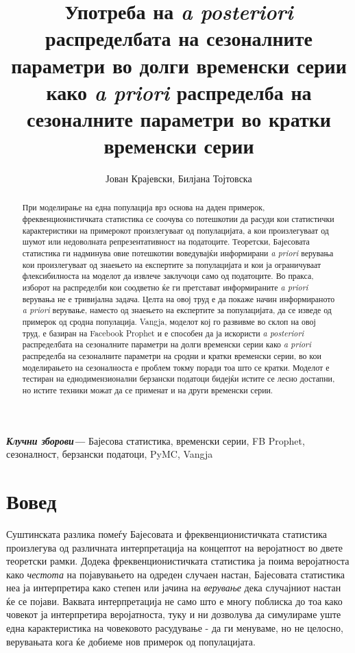 \documentclass[12pt]{article}
\title{Употреба на \textit{a posteriori} распределбата на сезоналните параметри во долги временски серии како \textit{a priori} распределба на сезоналните параметри во кратки временски серии}
\author{Јован Крајевски, Билјана Тојтовска}
\numberwithin{equation}{section}
\providecommand{\keywords}[1]
{
  \small
  \textbf{\textit{Клучни зборови---}} #1
}
\begin{document}
\maketitle

\newpage

\begin{abstract}
При моделирање на една популација врз основа на даден примерок, фреквенционистичката статистика се соочува со потешкотии да расуди кои статистички карактеристики на примерокот произлегуваат од популацијата, а кои произлегуваат од шумот или недоволната репрезентативност на податоците. Теоретски, Бајесовата статистика ги надминува овие потешкотии воведувајќи информирани \textit{a priori} верувања кои произлегуваат од знаењето на експертите за популацијата и кои ја ограничуваат флексибилноста на моделот да извлече заклучоци само од податоците. Во пракса, изборот на распределби кои соодветно ќе ги претстават информираните \textit{a priori} верувања не е тривијална задача. Целта на овој труд е да покаже начин информираното \textit{a priori} верување, наместо од знаењето на експертите за популацијата, да се изведе од примерок од сродна популација. Vangja, моделот кој го развивме во склоп на овој труд, е базиран на Facebook Prophet и е способен да ја искористи \textit{a posteriori} распределбата на сезоналните параметри на долги временски серии како \textit{a priori} распределба на сезоналните параметри на сродни и кратки временски серии, во кои моделирањето на сезоналноста е проблем токму поради тоа што се кратки. Моделот е тестиран на еднодимензионални берзански податоци бидејќи истите се лесно достапни, но истите техники можат да се применат и на други временски серии.
\end{abstract}

\keywords{Бајесова статистика, временски серии, FB Prophet, сезоналност, берзански податоци, PyMC, Vangja}

\newpage

\hypersetup{linkcolor=black}
\tableofcontents

\newpage

\section{Вовед}

Суштинската разлика помеѓу Бајесовата и фреквенционистичката статистика произлегува од различната интерпретација на концептот на веројатност во двете теоретски рамки. Додека фреквенционистичката статистика ја поима веројатноста како \textit{честота} на појавувањето на одреден случаен настан, Бајесовата статистика неа ја интерпретира како степен или јачина на \textit{верување} дека случајниот настан ќе се појави. Ваквата интерпретација не само што е многу поблиска до тоа како човекот ја интерпретира веројатноста, туку и ни дозволува да симулираме уште една карактеристика на човековото расудување - да ги менуваме, но не целосно, верувањата кога ќе добиеме нов примерок од популацијата.
\end{document}
